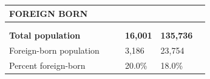 \documentclass[9pt]{report}
\begin{document}
\newpage
\setlength{\tabcolsep}{.01in} %
\begin{tabular}{p{.10in}p{.10in}p{.10in}p{3.7in}>{\hfill}p{.85in}>{\hfill}p{.85in}>{\hfill}p{.85in}>{\hfill}p{.85in}p{0.1in}}
\multicolumn{9}{l}{\parbox{7.1in}{\raggedright{\large{\strut\textbf{FOREIGN BORN}\strut}}}} \\ 
\hline
\multicolumn{4}{l}{\parbox{3.5in}{\raggedright{\textbf{}}}} & \multicolumn{1}{r}{\parbox{.85in}{\strut\raggedleft{\textbf{}\strut}}} & \multicolumn{1}{r}{\parbox{.85in}{\strut\raggedleft{\textbf{}\strut}}} & \multicolumn{1}{r}{\parbox{.85in}{\strut{}}} & \multicolumn{1}{r}{\parbox{.85in}{\strut{}}} & \\ 
\multicolumn{9}{l}{} \\ 
\multicolumn{4}{l}{\parbox{3.5in}{\strut\raggedright{\textbf{Total population}\strut}}} & \textbf{} & \textbf{} & \textbf{16,001} & \textbf{135,736} & \textbf{} \\ 
\multicolumn{4}{l}{\parbox{3.6in}{\strut\raggedright{{Foreign-born population}}\strut}} &  &  & 3,186 & 23,754 & \multicolumn{1}{l}{}  \\ 
\multicolumn{4}{l}{\parbox{3.6in}{\strut\raggedright{{Percent foreign-born}}\strut}} &  &  & 20.0\% & 18.0\% & \multicolumn{1}{l}{}  \\ 

\end{tabular}
\setlength{\tabcolsep}{6pt} %
\end{document}
